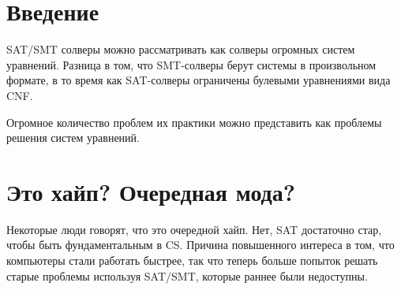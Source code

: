 \section{Введение}

\ac{SAT}/\ac{SMT} солверы можно рассматривать как солверы огромных систем уравнений.
Разница в том, что \ac{SMT}-солверы берут системы в произвольном формате,
в то время как \ac{SAT}-солверы ограничены булевыми уравнениями вида \ac{CNF}.

Огромное количество проблем их практики можно представить как проблемы решения систем уравнений.

\section{Это хайп? Очередная мода?}

Некоторые люди говорят, что это очередной хайп.
Нет, \ac{SAT} достаточно стар, чтобы быть фундаментальным в \ac{CS}.
Причина повышенного интереса в том, что компьютеры стали работать быстрее,
так что теперь больше попыток решать старые проблемы используя 
\ac{SAT}/\ac{SMT}, которые раннее были недоступны.

